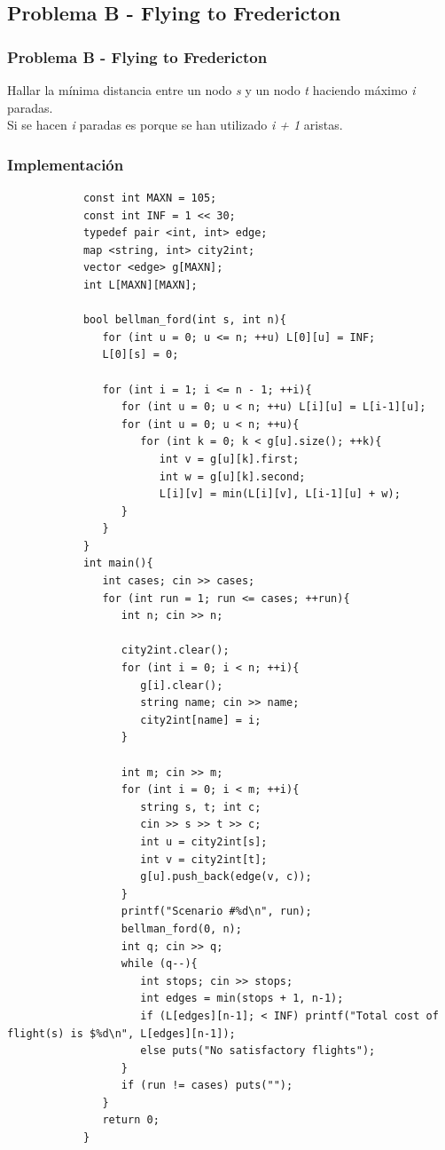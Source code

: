 \documentclass{beamer}
\begin{document}
	\subsection{Problema B - Flying to Fredericton}
	\begin{frame}
		\frametitle{Problema B - Flying to Fredericton}
		Hallar la mínima distancia entre un nodo \emph{s} y un nodo \emph{t} haciendo máximo \emph{i} paradas.\\
		Si se hacen \emph{i} paradas es porque se han utilizado \emph{i + 1} aristas.\\
	\end{frame}
	
	\begin{frame}
		\frametitle{Implementación}
		\begin{lstlisting}
			const int MAXN = 105;
			const int INF = 1 << 30;
			typedef pair <int, int> edge;
			map <string, int> city2int;
			vector <edge> g[MAXN];
			int L[MAXN][MAXN];

			bool bellman_ford(int s, int n){
			   for (int u = 0; u <= n; ++u) L[0][u] = INF;
			   L[0][s] = 0;

			   for (int i = 1; i <= n - 1; ++i){
			      for (int u = 0; u < n; ++u) L[i][u] = L[i-1][u];
			      for (int u = 0; u < n; ++u){
			         for (int k = 0; k < g[u].size(); ++k){
			            int v = g[u][k].first;
			            int w = g[u][k].second;
			            L[i][v] = min(L[i][v], L[i-1][u] + w);
			      }
			   }
			}
			int main(){
			   int cases; cin >> cases;
			   for (int run = 1; run <= cases; ++run){
			      int n; cin >> n;

			      city2int.clear();
			      for (int i = 0; i < n; ++i){
			         g[i].clear();
			         string name; cin >> name;
			         city2int[name] = i;
			      }

			      int m; cin >> m;
			      for (int i = 0; i < m; ++i){
			         string s, t; int c;
			         cin >> s >> t >> c;
			         int u = city2int[s];
			         int v = city2int[t];
			         g[u].push_back(edge(v, c));
			      }
			      printf("Scenario #%d\n", run);
			      bellman_ford(0, n);
			      int q; cin >> q;
			      while (q--){
			         int stops; cin >> stops;
			         int edges = min(stops + 1, n-1);
			         if (L[edges][n-1]; < INF) printf("Total cost of                   flight(s) is $%d\n", L[edges][n-1]);
			         else puts("No satisfactory flights");
			      }
			      if (run != cases) puts("");
			   }
			   return 0;
			}
		\end{lstlisting}
	\end{frame}
	
\end{document}
